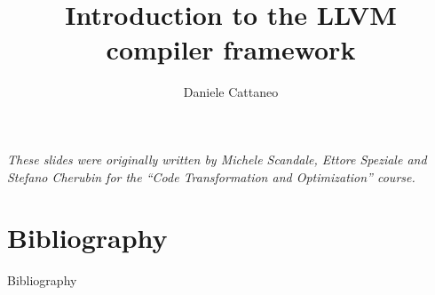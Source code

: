 \documentclass[10pt]{beamer}
\author{Daniele Cattaneo}
\institute{Politecnico di Milano}
\date{\DATE}
\title{Introduction to the LLVM compiler framework}
\begin{document}
\begin{frame}
\maketitle
\begin{center}
\itshape\scriptsize
These slides were originally written by
Michele Scandale, Ettore Speziale and Stefano Cherubin for the
``Code Transformation and Optimization'' course.
\end{center}
\end{frame}










\section{Bibliography}
\begin{frame}[allowframebreaks]{Bibliography}
\nocite{*}


\end{frame}
\end{document}
